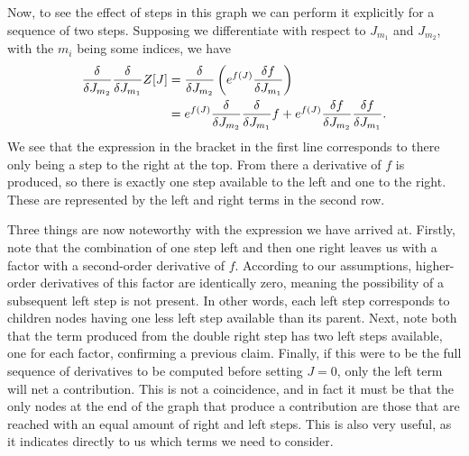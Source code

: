 Now, to see the effect of steps in this graph we can perform it explicitly for a sequence of two steps. Supposing we differentiate with respect to $J_{m_{1}}$ and $J_{m_{2}}$, with the $m_{i}$ being some indices, we have
\begin{align*}
	\fdv{J_{m_{2}}}\fdv{J_{m_{1}}}Z[J] &= \fdv{J_{m_{2}}}\left(e^{f(J)}\fdv{f}{J_{m_{1}}}\right) \\
	                                   &= e^{f(J)}\fdv{J_{m_{2}}}\fdv{J_{m_{1}}}f + e^{f(J)}\fdv{f}{J_{m_{2}}}\fdv{f}{J_{m_{1}}}.
\end{align*}
We see that the expression in the bracket in the first line corresponds to there only being a step to the right at the top. From there a derivative of $f$ is produced, so there is exactly one step available to the left and one to the right. These are represented by the left and right terms in the second row.

Three things are now noteworthy with the expression we have arrived at. Firstly, note that the combination of one step left and then one right leaves us with a factor with a second-order derivative of $f$. According to our assumptions, higher-order derivatives of this factor are identically zero, meaning the possibility of a subsequent left step is not present. In other words, each left step corresponds to children nodes having one less left step available than its parent. Next, note both that the term produced from the double right step has two left steps available, one for each factor, confirming a previous claim. Finally, if this were to be the full sequence of derivatives to be computed before setting $J = 0$, only the left term will net a contribution. This is not a coincidence, and in fact it must be that the only nodes at the end of the graph that produce a contribution are those that are reached with an equal amount of right and left steps. This is also very useful, as it indicates directly to us which terms we need to consider.

